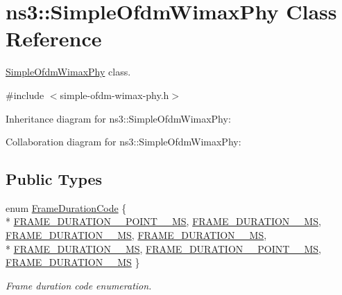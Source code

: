 \hypertarget{classns3_1_1SimpleOfdmWimaxPhy}{}\section{ns3\+:\+:Simple\+Ofdm\+Wimax\+Phy Class Reference}
\label{classns3_1_1SimpleOfdmWimaxPhy}


\hyperlink{classns3_1_1SimpleOfdmWimaxPhy}{Simple\+Ofdm\+Wimax\+Phy} class.  




{\ttfamily \#include $<$simple-\/ofdm-\/wimax-\/phy.\+h$>$}



Inheritance diagram for ns3\+:\+:Simple\+Ofdm\+Wimax\+Phy\+:


Collaboration diagram for ns3\+:\+:Simple\+Ofdm\+Wimax\+Phy\+:
\subsection*{Public Types}
\begin{DoxyCompactItemize}
\item 
enum \hyperlink{classns3_1_1SimpleOfdmWimaxPhy_a81778c2233487351f2136fe80c63e1e4}{Frame\+Duration\+Code} \{ \\*
\hyperlink{classns3_1_1SimpleOfdmWimaxPhy_a81778c2233487351f2136fe80c63e1e4a8088f603308b22c4b3267ba8a0d3cb23}{F\+R\+A\+M\+E\+\_\+\+D\+U\+R\+A\+T\+I\+O\+N\+\_\+\_\+\+P\+O\+I\+N\+T\+\_\+\_\+\+MS}, 
\hyperlink{classns3_1_1SimpleOfdmWimaxPhy_a81778c2233487351f2136fe80c63e1e4a31a8abe3f7708b2686cc2646d5702342}{F\+R\+A\+M\+E\+\_\+\+D\+U\+R\+A\+T\+I\+O\+N\+\_\+\_\+\+MS}, 
\hyperlink{classns3_1_1SimpleOfdmWimaxPhy_a81778c2233487351f2136fe80c63e1e4a0f6e0119b9e8ee1cbe3e6770b8fc520a}{F\+R\+A\+M\+E\+\_\+\+D\+U\+R\+A\+T\+I\+O\+N\+\_\+\_\+\+MS}, 
\hyperlink{classns3_1_1SimpleOfdmWimaxPhy_a81778c2233487351f2136fe80c63e1e4a114739c4a5e1bf73fab2a04b24809096}{F\+R\+A\+M\+E\+\_\+\+D\+U\+R\+A\+T\+I\+O\+N\+\_\+\_\+\+MS}, 
\\*
\hyperlink{classns3_1_1SimpleOfdmWimaxPhy_a81778c2233487351f2136fe80c63e1e4ae4800fe9d5b82ffb7c3e4f645de541be}{F\+R\+A\+M\+E\+\_\+\+D\+U\+R\+A\+T\+I\+O\+N\+\_\+\_\+\+MS}, 
\hyperlink{classns3_1_1SimpleOfdmWimaxPhy_a81778c2233487351f2136fe80c63e1e4a7e664cff7e9fc46eab639ea078130904}{F\+R\+A\+M\+E\+\_\+\+D\+U\+R\+A\+T\+I\+O\+N\+\_\+\_\+\+P\+O\+I\+N\+T\+\_\+\_\+\+MS}, 
\hyperlink{classns3_1_1SimpleOfdmWimaxPhy_a81778c2233487351f2136fe80c63e1e4a1ba3ca55fc897ace9c0ab62f63fd1550}{F\+R\+A\+M\+E\+\_\+\+D\+U\+R\+A\+T\+I\+O\+N\+\_\+\_\+\+MS}
 \}\begin{DoxyCompactList}\small\item\em Frame duration code enumeration. \end{DoxyCompactList}
\end{DoxyCompactItemize}
